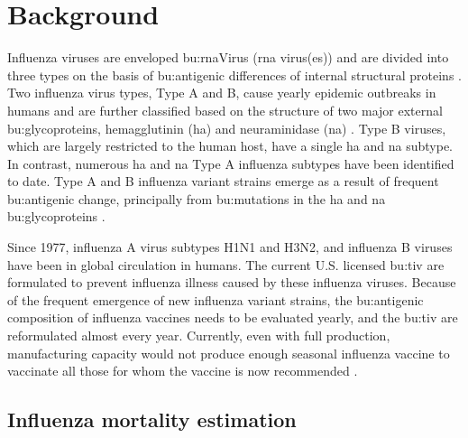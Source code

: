 

\makeglossaries





\tableofcontents
\newpage
\printglossary[type=bus]
\newpage
\printglossary[type=dm]
\newpage
\printglossary[type=\acronymtype]
\newpage


\section{Background}

Influenza viruses are enveloped \gls{bu:rnaVirus} (\acrshort{rna} virus(es)) and are divided into three types on the basis of \gls{bu:antigen}ic differences of internal structural proteins \citep{fdaGuidanceIndustryClinical2007}.
Two influenza virus types, Type A and B, cause yearly epidemic outbreaks in humans and are further classified based on the structure of two major external \gls{bu:glycoprotein}s, hemagglutinin (\acrshort{ha}) and neuraminidase (\acrshort{na}) \citep{fdaGuidanceIndustryClinical2007}.
Type B viruses, which are largely restricted to the human host, have a single \acrshort{ha} and \acrshort{na} subtype.
In contrast, numerous \acrshort{ha} and \acrshort{na} Type A influenza subtypes have been identified to date.
Type A and B influenza variant strains emerge as a result of frequent \gls{bu:antigen}ic change, principally from \gls{bu:mutation}s in the \acrshort{ha} and \acrshort{na} \gls{bu:glycoprotein}s \citep{fdaGuidanceIndustryClinical2007}.

Since 1977, influenza A virus subtypes H1N1 and H3N2, and influenza B viruses have been in global circulation in humans.
The current U.S. licensed \gls{bu:tiv} are formulated to prevent influenza illness caused by these influenza viruses.
Because of the frequent emergence of new influenza variant strains, the \gls{bu:antigen}ic composition of influenza vaccines needs to be evaluated yearly, and the \gls{bu:tiv} are reformulated almost every year.
Currently, even with full production, manufacturing capacity would not produce enough seasonal influenza vaccine to vaccinate all those for whom the vaccine is now recommended \citep{fdaGuidanceIndustryClinical2007}.

\subsection{Influenza mortality estimation}

